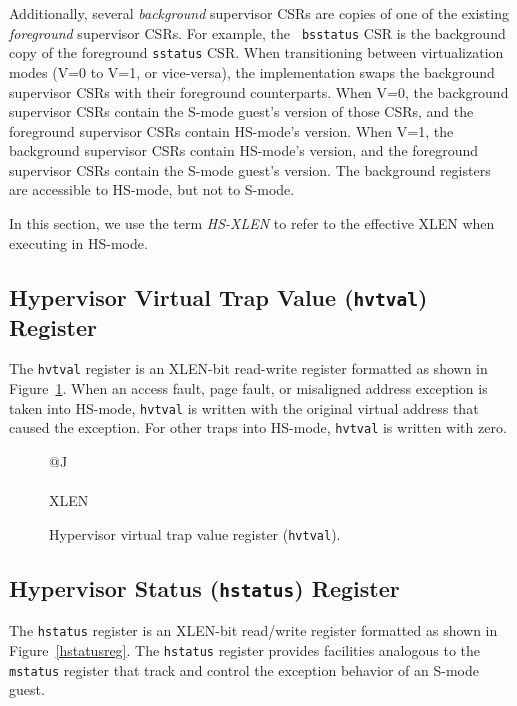 Additionally, several {\em background} supervisor CSRs are copies of one of
the existing {\em foreground} supervisor CSRs.  For example, the {\tt
bsstatus} CSR is the background copy of the foreground {\tt sstatus} CSR.
When transitioning between virtualization modes (V=0 to V=1, or vice-versa),
the implementation swaps the background supervisor CSRs with their foreground
counterparts.  When V=0, the background supervisor CSRs contain the S-mode
guest's version of those CSRs, and the foreground supervisor CSRs contain
HS-mode's version.  When V=1, the background supervisor CSRs contain HS-mode's
version, and the foreground supervisor CSRs contain the S-mode guest's
version.  The background registers are accessible to HS-mode, but not to S-mode.

In this section, we use the term {\em HS-XLEN} to refer to the effective XLEN
when executing in HS-mode.

\subsection{Hypervisor Virtual Trap Value ({\tt hvtval}) Register}

The {\tt hvtval} register is an XLEN-bit read-write register formatted as shown
in Figure~\ref{hvtvalreg}.  When an access fault, page fault, or misaligned
address exception is taken into HS-mode, {\tt hvtval} is
written with the original virtual address that caused the exception.
For other traps into HS-mode, {\tt hvtval} is written with zero.

\begin{figure}[h!]
{\footnotesize
\begin{center}
\begin{tabular}{@{}J}
 \\
\hline
{} \\
\hline
XLEN \\
\end{tabular}
\end{center}
}
\vspace{-0.1in}
\caption{Hypervisor virtual trap value register ({\tt hvtval}).}
\label{hvtvalreg}
\end{figure}

\subsection{Hypervisor Status ({\tt hstatus}) Register}

The {\tt hstatus} register is an XLEN-bit read/write register
formatted as shown in Figure~\ref{hstatusreg}.  The {\tt hstatus}
register provides facilities analogous to the {\tt mstatus} register
that track and control the exception behavior of an S-mode guest.

